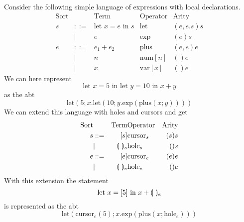 \documentclass[sigplan,anonymous,review]{acmart}
\begin{document}
\begin{example}\label{ex:abstract_syntax}
Consider the following simple language of expressions with local declarations.
\begin{align*}
  \text{Sort} && \text{Term} & \text{Operator} & \text{Arity} \\
        s & ::= & \text{let $x = e$ in $s$} & \text{let} & (e, e.s)s \\
        & | & e & \text{exp} & (e)s \\
        e & ::= & e_1 + e_2 & \text{plus} & (e,e)e \\
        & | & n & \text{num}[n] & ()e \\
        & | & x & \text{var}[x] & ()e
\end{align*}
 We can here represent
    \begin{equation*}
        \text{let $x=5$ in let $y=10$ in $x+y$}
    \end{equation*}
    as the abt
    \begin{equation*}
        \text{let}(5;x.\text{let}(10;y.\text{exp}(\text{plus}(x;y))))
    \end{equation*} 
%
    We can extend this language with holes and cursors and get
\begin{align*}
        \text{Sort} && \text{Term} & \text{Operator} & \text{Arity} \\
        s & ::= & [s] & \text{cursor}_s & (s)s \\
        & | & \llparenthesis \ \rrparenthesis_s & \text{hole}_s & ()s \\
        e & ::= & [e] & \text{cursor}_e & (e)e \\
        & | & \llparenthesis \ \rrparenthesis_e & \text{hole}_e & ()e
 \end{align*}
%
    With this extension the statement
    \begin{equation*}
        \text{let $x=[5]$ in $x+\llparenthesis \ \rrparenthesis_e$}
    \end{equation*}
    is represented as the abt
    \begin{equation*}
        \text{let}(\text{cursor}_e(5); x.\text{exp}(\text{plus}(x;\text{hole}_e)))    
    \end{equation*}
\end{example}
\end{document}
